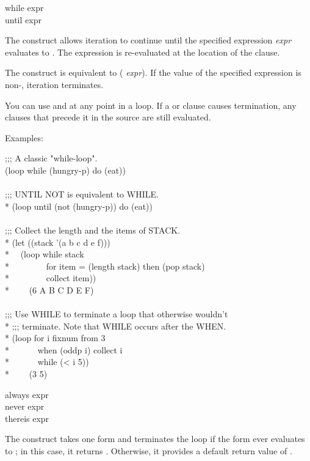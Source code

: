 \begin{new}
\begin{defloop}
while expr \\
until expr

The  construct allows iteration to continue until the specified
expression {\it expr} evaluates to .  The expression
is re-evaluated at the location of the  clause.

The  construct is equivalent to 
{ ( {\it expr})}.  If the value of the
specified expression is non-, iteration terminates.

You can use  and  
at any point in a loop.  If a  or  clause causes
termination, any clauses that precede it in the source
are still evaluated.  

Examples:
\begin{lisp}
;;; A classic "while-loop". \\
(loop while (hungry-p) do (eat)) \\
 \\
;;; UNTIL NOT is equivalent to WHILE. \\*
(loop until (not (hungry-p)) do (eat)) \\
 \\
;;; Collect the length and the items of STACK. \\*
(let ((stack '(a b c d e f))) \\*
~~(loop while stack \\*
~~~~~~~~for item = (length stack) then (pop stack) \\*
~~~~~~~~collect item)) \\*
~~~\EV~(6 A B C D E F) \\
 \\
;;; Use WHILE to terminate a loop that otherwise wouldn't \\*
;;; terminate.  Note that WHILE occurs after the WHEN. \\*
(loop for i fixnum from 3 \\*
~~~~~~when (oddp i) collect i \\*
~~~~~~while (< i 5)) \\*
~~~\EV~(3 5)
\end{lisp}
\end{defloop}


\begin{defloop}
always expr \\
never expr \\
thereis expr

The  construct takes one form and terminates the loop 
  if the form ever evaluates to ; in this case, it returns
  .  Otherwise, it provides a default return value of .


\end{defloop}
\end{new}
